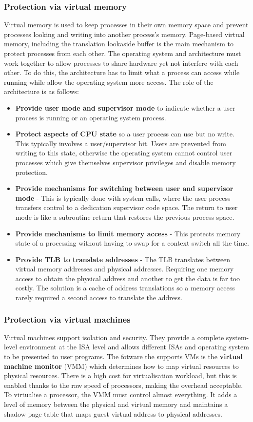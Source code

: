 \documentclass[11pt]{article}
\begin{document}
\subsubsection{Protection via virtual memory}
Virtual memory is used to keep processes in their own memory space and prevent processes looking and writing into another process's memory. Page-based virtual memory, including the translation lookaside buffer is the main mechanism to protect processes from each other. The operating system and architecture must work together to allow processes to share hardware yet not interfere with each other. To do this, the architecture has to limit what a process can access while running while allow the operating system more access. The role of the architecture is as follows:
\begin{itemize}
\item \textbf{Provide user mode and supervisor mode} to indicate whether a user process is running or an operating system process.
\item \textbf{Protect aspects of CPU state} so a user process can use but no write. This typically involves a user/supervisor bit. Users are prevented from writing to this state, otherwise the operating system cannot control user processes which give themselves supervisor privileges and disable memory protection.
\item \textbf{Provide mechanisms for switching between user and supervisor mode} - This is typically done with system calls, where the user process transfers control to a dedication supervisor code space. The return to user mode is like a subroutine return that restores the previous process space.
\item \textbf{Provide mechanisms to limit memory access} - This protects memory state of a processing without having to swap for a context switch all the time.
\item \textbf{Provide TLB to translate addresses} - The TLB translates between virtual memory addresses and physical addresses. Requiring one memory access to obtain the physical address and another to get the data is far too costly. The solution is a cache of address translations so a memory access rarely required a second access to translate the address. 
\end{itemize}

\subsubsection{Protection via virtual machines}
Virtual machines support isolation and security. They provide a complete system-level environment at the ISA level and allows different ISAs and operating system to be presented to user programs. The fotware the supports VMs is the \textbf{virtual machine monitor} (VMM) which determines how to map virtual resources to physical resources. There is a high cost for virtualisation workload, but this is enabled thanks to the raw speed of processors, making the overhead acceptable.
\n
To virtualise a processor, the VMM must control almost everything. It adds a level of memory between the physical and virtual memory and maintains a shadow page table that maps guest virtual address to physical addresses.
\end{document}
